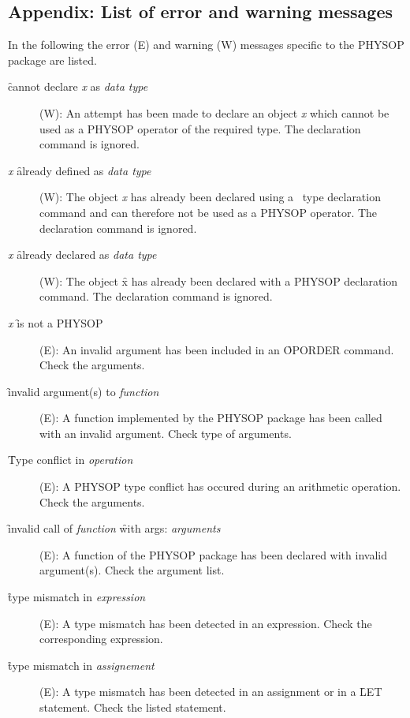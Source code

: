 \subsection{Appendix: List of error and warning messages}
In the following the error (E) and warning (W) messages specific to the
PHYSOP package are listed.
\begin{description}
\item[\f{cannot declare} {\it x}\f{ as }{\it data type}] (W):
 An attempt has been made to declare an
object {\it x} which cannot be used as a PHYSOP operator of the
required type. The declaration command is ignored.

\item [{\it x} \f{already defined as} {\it data type}] (W): The object
{\it x} has already been declared using a \REDUCE\ type declaration
command and can therefore not be used as a PHYSOP operator.
The declaration command is ignored.

\item [{\it x} \f{already declared as} {\it data type}] (W): The object
\f{x} has already been declared with a PHYSOP declaration command.
The declaration command is ignored.

\item[{\it x} \f{is not a PHYSOP}] (E): An invalid argument has been
included in an \f{OPORDER} command. Check the arguments.

\item[\f{invalid argument(s) to }{\it function}] (E): A
function implemented by the PHYSOP package has been called with an
invalid argument. Check type of arguments.


\item[\f{Type conflict in }{\it operation}] (E): A PHYSOP type conflict
has occured during an arithmetic operation. Check the arguments.

\item [\f{invalid call of }{\it function} \f{with args:} {\it arguments}]
(E): A function
of the PHYSOP package has been declared with invalid argument(s). Check
the argument list.

\item[\f{type mismatch in} {\it expression}] (E): A type mismatch has
been detected in an expression.  Check the corresponding expression.

\item[\f{type mismatch in} {\it assignement}] (E): A type
mismatch has been detected in an assignment or in a \f{LET}
statement. Check the listed statement.


\end{description}
